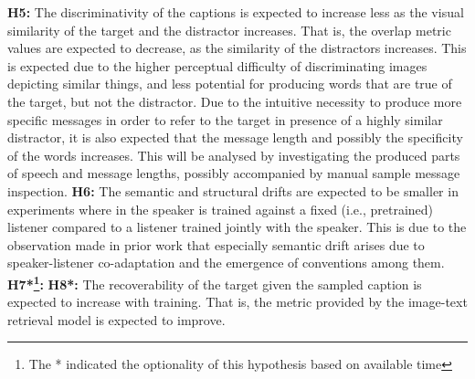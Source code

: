\textbf{H5:} The discriminativity of the captions is expected to increase less as the visual similarity of the target and the distractor increases. That is, the overlap metric values are expected to decrease, as the similarity of the distractors increases. This is expected due to the higher perceptual difficulty of discriminating images depicting similar things, and less potential for producing words that are true of the target, but not the distractor. Due to the intuitive necessity to produce more specific messages in order to refer to the target in presence of a highly similar distractor, it is also expected that the message length and possibly the specificity of the words increases. This will be analysed by investigating the produced parts of speech and message lengths, possibly accompanied by manual sample message inspection.\newline
\textbf{H6:}  The semantic and structural drifts are expected to be smaller in experiments where in the speaker is trained against a fixed (i.e., pretrained) listener compared to a listener trained jointly with the speaker. This is due to the observation made in prior work that especially semantic drift arises due to speaker-listener co-adaptation and the emergence of conventions among them. \newline
\textbf{H7*\footnote{The * indicated the optionality of this hypothesis based on available time}:}  \newline
\textbf{H8*:} The recoverability of the target given the sampled caption is expected to increase with training. That is, the metric provided by the image-text retrieval model is expected to improve. \newline

